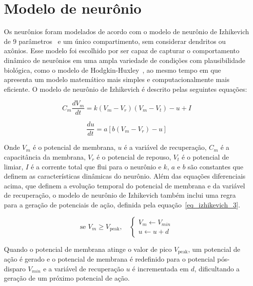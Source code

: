 \section{Modelo de neurônio}

Os neurônios foram modelados de acordo com o modelo de neurônio de Izhikevich de 9
parâmetros~\cite[cap.~8]{izhikevichDynamical2006} e um único compartimento, sem considerar dendritos ou axônios. Esse modelo foi
escolhido por ser capaz de capturar o comportamento dinâmico de neurônios em uma ampla variedade de condições com plausibilidade
biológica, como o modelo de Hodgkin-Huxley~\cite{hodgkinQuantitative1952b}, ao mesmo tempo em que apresenta um modelo matemático
mais simples e computacionalmente mais eficiente. O modelo de neurônio de Izhikevich é descrito pelas seguintes equações:


\begin{equation}
\label{eq_izhikevich_1}
C_m \frac{dV_m}{dt} = k (V_m - V_r)(V_m - V_t) - u + I
\end{equation}

\begin{equation}
\label{eq_izhikevich_2}
\frac{du}{dt} = a [b(V_m-V_r) - u]
\end{equation}

Onde $V_m$ é o potencial de membrana, $u$ é a variável de recuperação, $C_m$ é a capacitância da membrana, $V_r$ é o
potencial de repouso, $V_t$ é o potencial de limiar, $I$ é a corrente total que flui para o neurônio e $k$, $a$ e $b$ são
constantes que definem as características dinâmicas do neurônio. Além das equações diferenciais acima, que definem a evolução
temporal do potencial de membrana e da variável de recuperação, o modelo de neurônio de Izhikevich também inclui uma regra para
a geração de potenciais de ação, definida pela equação~\ref{eq_izhikevich_3}.

\begin{equation}
\label{eq_izhikevich_3}
\text{se } V_m \geq V_{\text{peak}}, \quad
\begin{cases}
V_m \gets V_{min} \\
u \gets u + d
\end{cases}
\end{equation}

Quando o potencial de membrana atinge o valor de pico $V_{\text{peak}}$, um potencial de ação é gerado e o potencial de membrana é
redefinido para o potencial pós-disparo $V_{min}$ e a variável de recuperação $u$ é incrementada em $d$, dificultando a geração de
um próximo potencial de ação.

